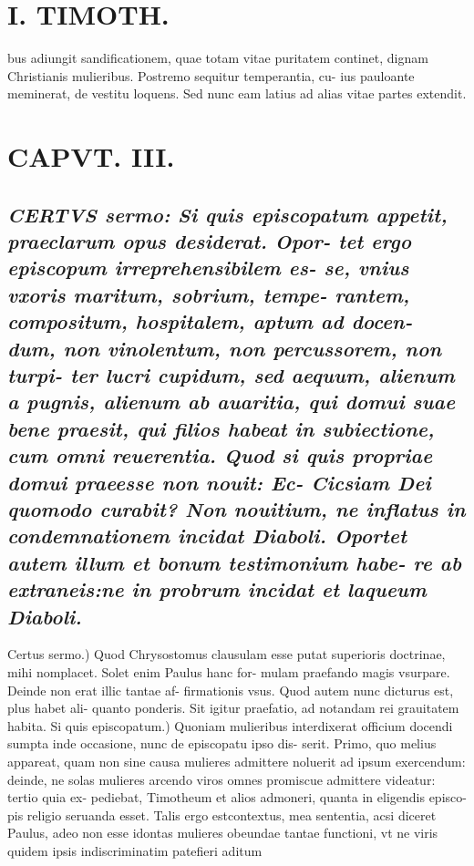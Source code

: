 \documentclass{article}
\begin{document}
\begin{pages}
\section*{I. TIMOTH. }
\marginpar{[ p.30 ]}\pstart bus adiungit sandificationem, quae totam vitae puritatem continet, dignam Christianis mulieribus. Postremo sequitur temperantia, cu- ius pauloante meminerat, de vestitu loquens. Sed nunc eam latius ad alias vitae partes extendit.  \pend
\endnumbering\beginnumbering\section{CAPVT. III.}
{}
\subsection*{\textit{\huge\textbf{C}\normalsize ERTVS sermo: Si quis episcopatum appetit, praeclarum opus desiderat. Opor- tet ergo episcopum irreprehensibilem es- se, vnius vxoris maritum, sobrium, tempe- rantem, compositum, hospitalem, aptum ad docen- dum, non vinolentum, non percussorem, non turpi- ter lucri cupidum, sed aequum, alienum a pugnis, alienum ab auaritia, qui domui suae bene praesit, qui filios habeat in subiectione, cum omni reuerentia. Quod si quis propriae domui praeesse non nouit: Ec- Cicsiam Dei quomodo curabit? Non nouitium, ne inflatus in condemnationem incidat Diaboli. Oportet autem illum et bonum testimonium habe- re ab extraneis:ne in probrum incidat et laqueum Diaboli. }}\pstart Certus sermo.) Quod Chrysostomus clausulam esse putat superioris doctrinae, mihi nomplacet. Solet enim Paulus hanc for- mulam praefando magis vsurpare. Deinde non erat illic tantae af- firmationis vsus. Quod autem nunc dicturus est, plus habet ali- quanto ponderis. Sit igitur praefatio, ad notandam rei grauitatem  \pend\pstart habita. Si quis episcopatum.) Quoniam mulieribus interdixerat officium docendi sumpta inde occasione, nunc de episcopatu ipso dis- serit. Primo, quo melius appareat, quam non sine causa mulieres admittere noluerit ad ipsum exercendum: deinde, ne solas mulieres arcendo viros omnes promiscue admittere videatur: tertio quia ex- pediebat, Timotheum et alios admoneri, quanta in eligendis episco- pis religio seruanda esset. Talis ergo estcontextus, mea sententia, acsi diceret Paulus, adeo non esse idontas mulieres obeundae tantae functioni, vt ne viris quidem ipsis indiscriminatim patefieri aditum  \pend

\end{pages}
\end{document}
